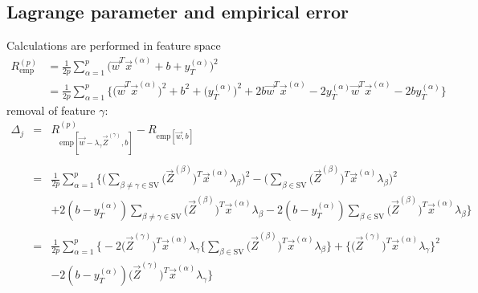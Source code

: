 \subsection{Lagrange parameter and empirical error}
Calculations are performed in feature space
\begin{equation}
	\begin{array}{ll}
	R_{ \mathrm{emp} }^{ (p) }  
	& = \frac{1}{2p} \sum_{ \alpha = 1 }^p \big(
		\vec{w}^T 
		\vec{x}^{ (\alpha) }
		+ b + y_T^{ (\alpha) } \big)^2 \\
	& = \frac{1}{2p} \sum_{ \alpha = 1 }^p \Bigg\{
		\big( \vec{w}^T 
		\vec{x}^{ (\alpha) } \big)^2
		+ b^2 + \big( y_T^{ (\alpha) } \big)^2
		+ 2 b \vec{w}^T
			\vec{x}^{ (\alpha) }
		- 2 y_T^{ (\alpha) } \vec{w}^T
			\vec{x}^{ (\alpha) }
		- 2 b y_T^{ (\alpha) } \Bigg\}
	\end{array}
\end{equation}
removal of feature $\gamma$:
\begin{equation}
	\begin{array}{lcl}
	\Delta_j 
	& = &	R_{ \mathrm{emp} [ \vec{w} - 
			\lambda_\gamma \vec{Z}^{(\gamma)},
			b ] }^{ (p) }
		- R_{ \mathrm{emp} [ \vec{w}, b  ] } \\\\
	& = & \frac{1}{2p} \sum_{ \alpha = 1 }^p \Bigg\{
		\Big( \sum_{ \beta \neq \gamma \in \mathrm{SV} }
			\big( \vec{Z}^{(\beta)} \big)^T 
			\vec{x}^{ (\alpha) }
			\lambda_\beta \Big)^2 
		- \Big( \sum_{ \beta \in \mathrm{SV} }
			\big( \vec{Z}^{(\beta)} \big)^T 
			\vec{x}^{ (\alpha) }
			\lambda_\beta \Big)^2 \\
	&&	+ 2 (b - y_T^{(\alpha)}) 
			\sum_{ \beta \neq \gamma \in \mathrm{SV} }
			\big( \vec{Z}^{(\beta)} \big)^T 
			\vec{x}^{ (\alpha) }
			\lambda_\beta
		- 2 (b - y_T^{(\alpha)}) \sum_{ \beta  \in \mathrm{SV} }
			\big( \vec{Z}^{(\beta)} \big)^T 
			\vec{x}^{ (\alpha) }
			\lambda_\beta
		\Bigg\} \\\\
	& = & \frac{1}{2p} \sum_{ \alpha = 1 }^p \Bigg\{
		- 2 \big( \vec{Z}^{(\gamma)} \big)^T
			\vec{x}^{ (\alpha) } \lambda_\gamma
		\bigg\{ \sum_{ \beta  \in \mathrm{SV} }
			\big( \vec{Z}^{(\beta)} \big)^T 
			\vec{x}^{ (\alpha) }
			\lambda_\beta \bigg\}
		+ \bigg\{ \big( \vec{Z}^{(\gamma)} \big)^T
			\vec{x}^{ (\alpha) } \lambda_\gamma
		\bigg\}^2 \\
	&&	- 2 (b - y_T^{(\alpha)})
			\big( \vec{Z}^{(\gamma)} \big)^T
			\vec{x}^{ (\alpha) } \lambda_\gamma
		\Bigg\}
	\end{array}
\end{equation}
